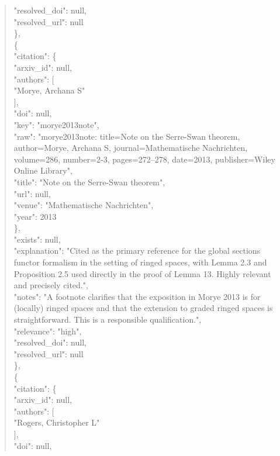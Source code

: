 \documentclass[11pt]{article}
\begin{document}
\begin{quote}
      "resolved\_doi": null,\\
      "resolved\_url": null\\
    \},\\
    \{\\
      "citation": \{\\
        "arxiv\_id": null,\\
        "authors": [\\
          "Morye, Archana S"\\
        ],\\
        "doi": null,\\
        "key": "morye2013note",\\
        "raw": "morye2013note: title=Note on the Serre-Swan theorem, author=Morye, Archana S, journal=Mathematische Nachrichten, volume=286, number=2-3, pages=272--278, date=2013, publisher=Wiley Online Library",\\
        "title": "Note on the Serre-Swan theorem",\\
        "url": null,\\
        "venue": "Mathematische Nachrichten",\\
        "year": 2013\\
      \},\\
      "exists": null,\\
      "explanation": "Cited as the primary reference for the global sections functor formalism in the setting of ringed spaces, with Lemma 2.3 and Proposition 2.5 used directly in the proof of Lemma 13. Highly relevant and precisely cited.",\\
      "notes": "A footnote clarifies that the exposition in Morye 2013 is for (locally) ringed spaces and that the extension to graded ringed spaces is straightforward. This is a responsible qualification.",\\
      "relevance": "high",\\
      "resolved\_doi": null,\\
      "resolved\_url": null\\
    \},\\
    \{\\
      "citation": \{\\
        "arxiv\_id": null,\\
        "authors": [\\
          "Rogers, Christopher L"\\
        ],\\
        "doi": null,\\

\end{quote}
\end{document}
